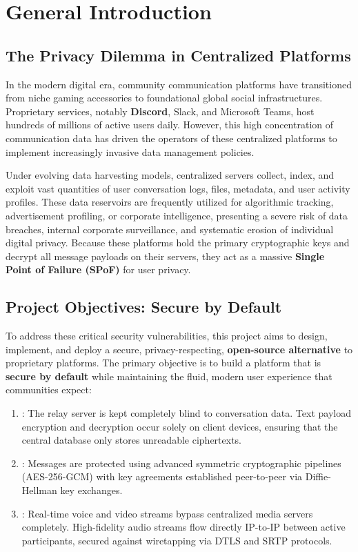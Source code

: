 
\chapter*{General Introduction}

\section*{The Privacy Dilemma in Centralized Platforms}
In the modern digital era, community communication platforms have transitioned from niche gaming accessories to foundational global social infrastructures. Proprietary services, notably \textbf{Discord}, Slack, and Microsoft Teams, host hundreds of millions of active users daily. However, this high concentration of communication data has driven the operators of these centralized platforms to implement increasingly invasive data management policies. 

Under evolving data harvesting models, centralized servers collect, index, and exploit vast quantities of user conversation logs, files, metadata, and user activity profiles. These data reservoirs are frequently utilized for algorithmic tracking, advertisement profiling, or corporate intelligence, presenting a severe risk of data breaches, internal corporate surveillance, and systematic erosion of individual digital privacy. Because these platforms hold the primary cryptographic keys and decrypt all message payloads on their servers, they act as a massive \textbf{Single Point of Failure (SPoF)} for user privacy.

\section*{Project Objectives: Secure by Default}
To address these critical security vulnerabilities, this project aims to design, implement, and deploy a secure, privacy-respecting, \textbf{open-source alternative} to proprietary platforms. The primary objective is to build a platform that is \textbf{secure by default} while maintaining the fluid, modern user experience that communities expect:
\begin{enumerate}
    \item {}: The relay server is kept completely blind to conversation data. Text payload encryption and decryption occur solely on client devices, ensuring that the central database only stores unreadable ciphertexts.
    \item {}: Messages are protected using advanced symmetric cryptographic pipelines (AES-256-GCM) with key agreements established peer-to-peer via Diffie-Hellman key exchanges.
    \item {}: Real-time voice and video streams bypass centralized media servers completely. High-fidelity audio streams flow directly IP-to-IP between active participants, secured against wiretapping via DTLS and SRTP protocols.
\end{enumerate}

